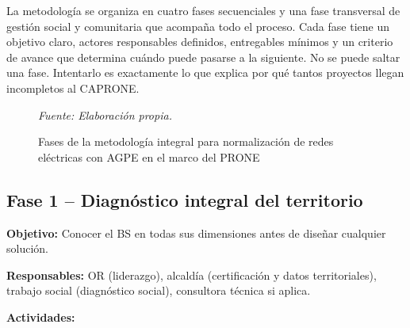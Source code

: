 La metodología se organiza en cuatro fases secuenciales y una fase
transversal de gestión social y comunitaria que acompaña todo el proceso.
Cada fase tiene un objetivo claro, actores responsables definidos,
entregables mínimos y un criterio de avance que determina cuándo puede
pasarse a la siguiente. No se puede saltar una fase. Intentarlo es
exactamente lo que explica por qué tantos proyectos llegan incompletos
al CAPRONE.

\begin{figure}[H]
\centering
\caption{Fases de la metodología integral para normalización de redes eléctricas con AGPE en el marco del PRONE}
\label{fig:fases_metodologia}
\footnotesize\textit{Fuente: Elaboración propia.}
\end{figure}

\subsection{Fase 1 -- Diagnóstico integral del territorio}
\label{subsec:fase1}

\textbf{Objetivo:} Conocer el BS en todas sus dimensiones antes de
diseñar cualquier solución.

\textbf{Responsables:} OR (liderazgo), alcaldía (certificación y datos
territoriales), trabajo social (diagnóstico social), consultora técnica
si aplica.

\textbf{Actividades:}

